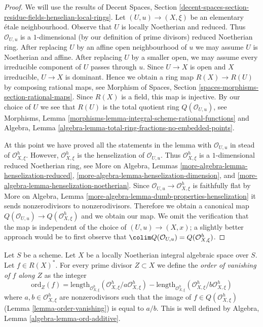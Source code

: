 \begin{proof}
We will use the results of Decent Spaces, Section
\ref{decent-spaces-section-residue-fields-henselian-local-rings}.
Let $(U, u) \to (X, \xi)$ be an elementary \'etale neighbourhood.
Observe that $U$ is locally Noetherian and reduced.
Thus $\mathcal{O}_{U, u}$ is a $1$-dimensional
(by our definition of prime divisors)
reduced Noetherian ring.
After replacing $U$ by an affine open neighbourhood of $u$
we may assume $U$ is Noetherian and affine.
After replacing $U$ by a smaller open, we may assume every irreducible
component of $U$ passes through $u$.
Since $U \to X$ is open and $X$ irreducible, $U \to X$ is dominant.
Hence we obtain a ring map $R(X) \to R(U)$ by composing rational maps, see
Morphism of Spaces, Section \ref{spaces-morphisms-section-rational-maps}.
Since $R(X)$ is a field, this map is injective.
By our choice of $U$ we see that $R(U)$ is the total quotient
ring $Q(\mathcal{O}_{U, u})$, see
Morphisms, Lemma \ref{morphisms-lemma-integral-scheme-rational-functions}
and
Algebra, Lemma \ref{algebra-lemma-total-ring-fractions-no-embedded-points}.

\medskip\noindent
At this point we have proved all the statements in the lemma with
$\mathcal{O}_{U, u}$ in stead of $\mathcal{O}_{X, \xi}^h$.
However, $\mathcal{O}_{X, \xi}^h$ is the henselization of
$\mathcal{O}_{U, u}$. Thus $\mathcal{O}_{X, \xi}^h$ is a $1$-dimensional
reduced Noetherian ring, see
More on Algebra, Lemmas
\ref{more-algebra-lemma-henselization-reduced},
\ref{more-algebra-lemma-henselization-dimension}, and
\ref{more-algebra-lemma-henselization-noetherian}.
Since $\mathcal{O}_{U, u} \to \mathcal{O}_{X, \xi}^h$ is
faithfully flat by More on Algebra, Lemma
\ref{more-algebra-lemma-dumb-properties-henselization}
it sends nonzerodivisors to nonzerodivisors.
Therefore we obtain a canonical map
$Q(\mathcal{O}_{U, u}) \to Q(\mathcal{O}_{X, \xi}^h)$
and we obtain our map.
We omit the verification that the map is independent of
the choice of $(U, u) \to (X, x)$; a slightly better
approach would be to first observe that
$\colim Q(\mathcal{O}_{U, u}) = Q(\mathcal{O}_{X, \xi}^h)$.
\end{proof}

\begin{definition}
\label{definition-order-vanishing}
Let $S$ be a scheme. Let $X$ be a locally Noetherian integral algebraic
space over $S$. Let $f \in R(X)^*$. For every prime divisor
$Z \subset X$ we define the {\it order of vanishing of $f$ along $Z$}
as the integer
$$
\text{ord}_Z(f) =
\text{length}_{\mathcal{O}_{X, \xi}^h}
(\mathcal{O}_{X, \xi}^h/a \mathcal{O}_{X, \xi}^h) -
\text{length}_{\mathcal{O}_{X, \xi}^h}
(\mathcal{O}_{X, \xi}^h/b \mathcal{O}_{X, \xi}^h)
$$
where $a, b \in \mathcal{O}_{X, \xi}^h$ are nonzerodivisors
such that the image of $f \in Q(\mathcal{O}_{X, \xi}^h)$
(Lemma \ref{lemma-order-vanishing}) is equal to $a/b$.
This is well defined by
Algebra, Lemma \ref{algebra-lemma-ord-additive}.
\end{definition}

